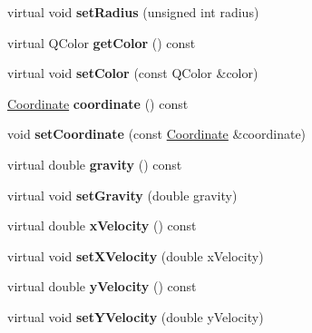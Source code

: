 \begin{DoxyCompactItemize}
\item 
\hypertarget{classas1_ball_ae85073d8c54259c53aef7347d0a1fd8e}{virtual void {\bfseries set\+Radius} (unsigned int radius)}\label{classas1_ball_ae85073d8c54259c53aef7347d0a1fd8e}

\item 
\hypertarget{classas1_ball_ac2a5cb332cccec8c784dd2d44d9b82e0}{virtual Q\+Color {\bfseries get\+Color} () const }\label{classas1_ball_ac2a5cb332cccec8c784dd2d44d9b82e0}

\item 
\hypertarget{classas1_ball_a0c2cffe428baf8d586f05bc229309f64}{virtual void {\bfseries set\+Color} (const Q\+Color \&color)}\label{classas1_ball_a0c2cffe428baf8d586f05bc229309f64}

\item 
\hypertarget{classas1_ball_a4241836c0a915ffce22d4d6ea24d6e12}{\hyperlink{class_coordinate}{Coordinate} {\bfseries coordinate} () const }\label{classas1_ball_a4241836c0a915ffce22d4d6ea24d6e12}

\item 
\hypertarget{classas1_ball_a4ac05af1d90fdda9a93fcd64f9a406c2}{void {\bfseries set\+Coordinate} (const \hyperlink{class_coordinate}{Coordinate} \&coordinate)}\label{classas1_ball_a4ac05af1d90fdda9a93fcd64f9a406c2}

\item 
\hypertarget{classas1_ball_ae81e1f764f335e54d9d84df62b7186e3}{virtual double {\bfseries gravity} () const }\label{classas1_ball_ae81e1f764f335e54d9d84df62b7186e3}

\item 
\hypertarget{classas1_ball_a79a5a810e5d904f97cd69d60718f3db7}{virtual void {\bfseries set\+Gravity} (double gravity)}\label{classas1_ball_a79a5a810e5d904f97cd69d60718f3db7}

\item 
\hypertarget{classas1_ball_a7b3d89540f1d10414108b4b630a8c282}{virtual double {\bfseries x\+Velocity} () const }\label{classas1_ball_a7b3d89540f1d10414108b4b630a8c282}

\item 
\hypertarget{classas1_ball_aa54cf0547ab8368ad8c34f5296bca755}{virtual void {\bfseries set\+X\+Velocity} (double x\+Velocity)}\label{classas1_ball_aa54cf0547ab8368ad8c34f5296bca755}

\item 
\hypertarget{classas1_ball_a7e973374f9b8c41266fa2015a78ab525}{virtual double {\bfseries y\+Velocity} () const }\label{classas1_ball_a7e973374f9b8c41266fa2015a78ab525}

\item 
\hypertarget{classas1_ball_ab616bff9e12c9cc9d0fc1f8c7d4f47ec}{virtual void {\bfseries set\+Y\+Velocity} (double y\+Velocity)}\label{classas1_ball_ab616bff9e12c9cc9d0fc1f8c7d4f47ec}

\end{DoxyCompactItemize}
